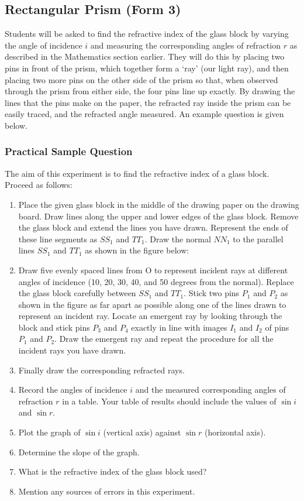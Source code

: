 \documentclass[12pt,a4paper]{report}
\begin{document}
\subsection{Rectangular Prism (Form 3)}

Students will be asked to find the refractive index of the glass block by varying
the angle of incidence $i$ and measuring the corresponding angles of refraction $r$ as
described in the Mathematics section earlier. They will do this by placing two pins in
front of the prism, which together form a `ray' (our light ray), and then placing two more
pins on the other side of the prism so that, when observed through the prism from either
side, the four pins line up exactly. By drawing the lines that the pins make on the paper,
the refracted ray inside the prism can be easily traced, and the refracted angle measured.
An example question is given below.

\subsubsection{Practical Sample Question}

The aim of this experiment is to find the refractive index of a glass block. Proceed
as follows:
\begin{enumerate}
\item{Place the given glass block in the middle of the drawing paper on the drawing
board. Draw lines along the upper and lower edges of the glass block. Remove the
glass block and extend the lines you have drawn. Represent the ends of these line
segments as $SS_1$ and $TT_1$. Draw the normal $NN_1$ to the parallel lines $SS_1$ and
$TT_1$ as shown in the figure below:
}%

\item{Draw five evenly spaced lines from O to represent incident rays at different
angles of incidence (10, 20, 30, 40, and 50 degrees from the normal). Replace the
glass block carefully between $SS_1$ and $TT_1$. Stick two pins $P_1$ and $P_2$ as shown in
the figure as far apart as possible along one of the lines drawn to represent an
incident ray. Locate an emergent ray by looking through the block and stick pins
$P_3$ and $P_4$ exactly in line with images $I_1$ and $I_2$ of pins $P_1$ and $P_2$. Draw the
emergent ray and repeat the procedure for all the incident rays you have drawn.}
\item{Finally draw the corresponding refracted rays.}


\item{Record the angles of incidence $i$ and the measured corresponding angles of
refraction $r$ in a table. Your table of results should include the values of
$\sin{i}$ and $\sin{r}$.}
\item{Plot the graph of $\sin{i}$ (vertical axis) against $\sin{r}$ (horizontal axis).}
\item{Determine the slope of the graph.}
\item{What is the refractive index of the glass block used?}
\item{Mention any sources of errors in this experiment.}
\end{enumerate}
\end{document}
